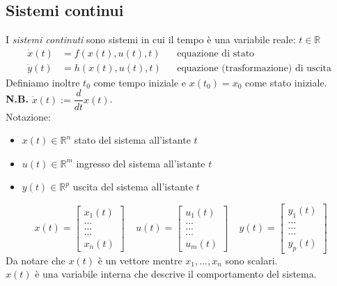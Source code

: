 \documentclass{article}
\begin{document}
\subsection{Sistemi continui}
I \textit{sistemi continuti} sono sistemi in cui il tempo è una variabile reale: $t \in \mathbb{R}$
\begin{align*}
    \dot x(t) &= f \left( x(t), u(t), t \right) & &\text{equazione di stato}\\
    \dot y(t) &= h\left(x(t), u(t), t\right) & &\text{equazione  (trasformazione) di uscita }
\end{align*}
Definiamo inoltre $t_0$ come tempo iniziale e $x(t_0)=x_0$ come stato iniziale. \\
\textbf{N.B.} $\dot x(t) := \dfrac{d}{dt}x(t)$.
\vspace*{0.1cm}\\
Notazione:
\begin{itemize}
    \item $x(t) \in \mathbb{R}^n$ stato del sistema all'istante $t$
    \item $u(t) \in \mathbb{R}^m$ ingresso del sistema all'istante $t$
    \item $y(t) \in \mathbb{R}^p$ uscita del sistema all'istante $t$
\end{itemize}
\[
    x(t)=
    \begin{bmatrix}
        x_1(t)\\
        ...\\
        ...\\
        ...\\
        x_n(t)
    \end{bmatrix}
    \ \ \ \ \ 
    u(t) =
    \begin{bmatrix}
        u_1(t)\\
        ...\\
        ...\\
        ...\\
        u_m(t)
    \end{bmatrix}
    \ \ \ \ \ 
    y(t) = 
    \begin{bmatrix}
        y_1(t)\\
        ...\\
        ...\\
        ...\\
        y_p(t)
    \end{bmatrix}
\]
Da notare che $x(t)$ è un vettore mentre $x_1,...,x_n$ sono scalari.\\
$x(t)$ è una variabile interna che descrive il comportamento del sistema.
\end{document}
